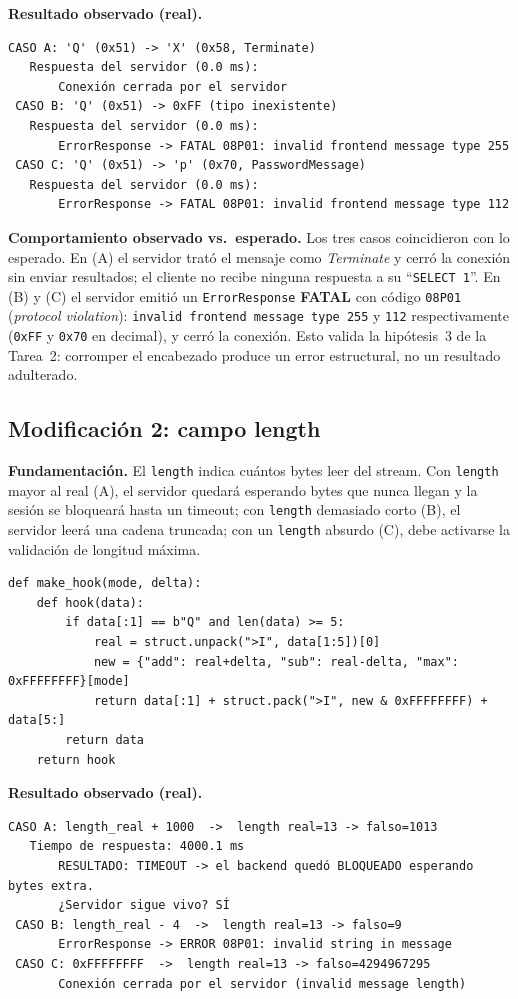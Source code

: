 \documentclass[11pt]{article}
\begin{document}
\textbf{Resultado observado (real).}
\begin{lstlisting}[style=salida]
 CASO A: 'Q' (0x51) -> 'X' (0x58, Terminate)
   Respuesta del servidor (0.0 ms):
       Conexión cerrada por el servidor
 CASO B: 'Q' (0x51) -> 0xFF (tipo inexistente)
   Respuesta del servidor (0.0 ms):
       ErrorResponse -> FATAL 08P01: invalid frontend message type 255
 CASO C: 'Q' (0x51) -> 'p' (0x70, PasswordMessage)
   Respuesta del servidor (0.0 ms):
       ErrorResponse -> FATAL 08P01: invalid frontend message type 112
\end{lstlisting}

\textbf{Comportamiento observado vs.\ esperado.} Los tres casos coincidieron con
lo esperado. En (A) el servidor trató el mensaje como \emph{Terminate} y cerró la
conexión sin enviar resultados; el cliente no recibe ninguna respuesta a su
``\texttt{SELECT 1}''. En (B) y (C) el servidor emitió un \texttt{ErrorResponse}
\textbf{FATAL} con código \texttt{08P01} (\emph{protocol violation}):
\texttt{invalid frontend message type 255} y \texttt{112} respectivamente
(\texttt{0xFF} y \texttt{0x70} en decimal), y cerró la conexión. Esto valida la
hipótesis~3 de la Tarea~2: corromper el encabezado produce un error estructural,
no un resultado adulterado.

\subsection{Modificación 2: campo length}
\label{sec:mod2}
\textbf{Fundamentación.} El \texttt{length} indica cuántos bytes leer del stream.
Con \texttt{length} mayor al real (A), el servidor quedará esperando bytes que
nunca llegan y la sesión se bloqueará hasta un timeout; con \texttt{length}
demasiado corto (B), el servidor leerá una cadena truncada; con un
\texttt{length} absurdo (C), debe activarse la validación de longitud máxima.

\begin{lstlisting}[style=python, caption={Hook que altera el campo length (\texttt{mod\_2\_length.py}).}]
def make_hook(mode, delta):
    def hook(data):
        if data[:1] == b"Q" and len(data) >= 5:
            real = struct.unpack(">I", data[1:5])[0]
            new = {"add": real+delta, "sub": real-delta, "max": 0xFFFFFFFF}[mode]
            return data[:1] + struct.pack(">I", new & 0xFFFFFFFF) + data[5:]
        return data
    return hook
\end{lstlisting}

\textbf{Resultado observado (real).}
\begin{lstlisting}[style=salida]
 CASO A: length_real + 1000  ->  length real=13 -> falso=1013
   Tiempo de respuesta: 4000.1 ms
       RESULTADO: TIMEOUT -> el backend quedó BLOQUEADO esperando bytes extra.
       ¿Servidor sigue vivo? SÍ
 CASO B: length_real - 4  ->  length real=13 -> falso=9
       ErrorResponse -> ERROR 08P01: invalid string in message
 CASO C: 0xFFFFFFFF  ->  length real=13 -> falso=4294967295
       Conexión cerrada por el servidor (invalid message length)
\end{lstlisting}
\end{document}
